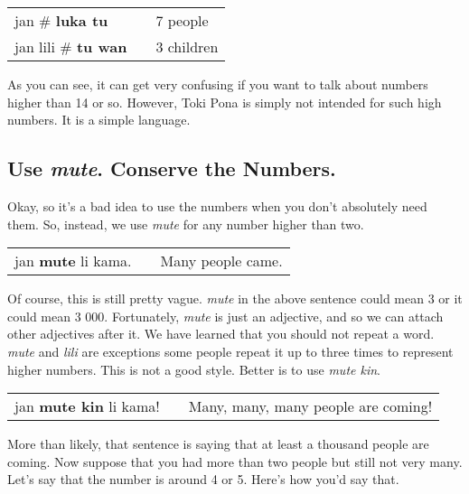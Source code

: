 \begin{supertabular}{p{5,5cm}|ll}
jan \# \textbf{luka tu} && 7 people \\
jan lili \# \textbf{tu wan} && 3 children \\
\end{supertabular} 

As you can see, it can get very confusing if you want to talk about numbers higher than 14 or so.
However, Toki Pona is simply not intended for such high numbers. 
It is a simple language. 
%
\newpage
{}
\subsection*{Use \textit{mute}. Conserve the Numbers.}
%
Okay, so it's a bad idea to use the numbers when you don't absolutely need them. 
So, instead, we use \textit{mute} for any number higher than two.

\begin{supertabular}{p{5,5cm}|ll}
jan \textbf{mute} li kama. && Many people came. \\
\end{supertabular} 

Of course, this is still pretty vague. 
\textit{mute} in the above sentence could mean 3 or it could mean 3 000. 
Fortunately, \textit{mute} is just an adjective, and so we can attach other adjectives after it. 
We have learned that you should not repeat a word. \textit{mute} and \textit{lili} are exceptions some people repeat it up to three times to represent higher numbers. 
This is not a good style. 
Better is to use \textit{mute kin}. 

\begin{supertabular}{p{5,5cm}|ll}
jan \textbf{mute kin} li kama! && Many, many, many people are coming! \\
\end{supertabular} 

More than likely, that sentence is saying that at least a thousand people are coming.  
Now suppose that you had more than two people but still not very many. 
Let's say that the number is around 4 or 5. Here's how you'd say that. 

